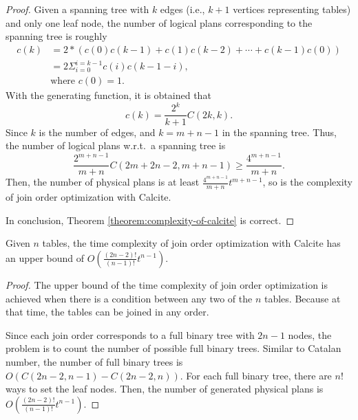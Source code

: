 \documentclass[sigconf, nonacm]{acmart}
\begin{document}
\begin{proof}
    Given a spanning tree with $k$ edges (i.e., $k+1$ vertices representing tables) and only one leaf node, the number of logical plans corresponding to the spanning tree is roughly
    \begin{equation*}
        \begin{split}
            c(k) & = 2 * (c(0)c(k-1) + c(1)c(k-2) + \cdots + c(k-1)c(0)) \\
            & = 2\Sigma_{i=0}^{i=k-1}c(i)c(k-1-i), \\
            & \text{where } c(0) = 1.
        \end{split}
    \end{equation*}
    With the generating function, it is obtained that 
    \begin{equation*}
        c(k) = \frac{2^k}{k+1}C(2k, k).
    \end{equation*}
    Since $k$ is the number of edges, and $k = m + n - 1$ in the spanning tree.
    Thus, the number of logical plans w.r.t.~a spanning tree is 
    \begin{equation*}
        \frac{2^{m+n-1}}{m+n}C(2m+2n-2, m+n-1) \geq \frac{4^{m+n-1}}{m+n}.
    \end{equation*}
   Then, the number of physical plans is at least $\frac{4^{m+n-1}}{m+n}t^{m+n-1}$, so is the complexity of join order optimization with Calcite.
   
   In conclusion, Theorem \ref{theorem:complexity-of-calcite} is correct.
\end{proof}

\begin{lemma}
    \label{lemma:upper-bound-of-calcite}
    Given $n$ tables, the time complexity of join order optimization with Calcite has an upper bound of $O(\frac{(2n-2)!}{(n-1)!}t^{n-1})$.
\end{lemma}
\begin{proof}
    The upper bound of the time complexity of join order optimization is achieved when there is a condition between any two of the $n$ tables.
    Because at that time, the tables can be joined in any order.

    Since each join order corresponds to a full binary tree with $2n-1$ nodes, the problem is to count the number of possible full binary trees.
    Similar to Catalan number, the number of full binary trees is $O(C(2n-2, n-1) - C(2n-2, n))$.
    For each full binary tree, there are $n!$ ways to set the leaf nodes. 
    Then, the number of generated physical plans is $O(\frac{(2n-2)!}{(n-1)!}t^{n-1})$.
\end{proof}
\end{document}
